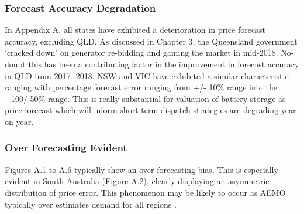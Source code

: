 \subsubsection{Forecast Accuracy Degradation}
In Appendix A, all states have exhibited a deterioration in price forecast accuracy, excluding QLD. As discussed in Chapter 3, the Queensland government `cracked down' on generator re-bidding and gaming the market in mid-2018. No-doubt this has been a contributing factor in the improvement in forecast accuracy in QLD from 2017- 2018. NSW and VIC have exhibited a similar characteristic ranging with percentage forecast error ranging from +/- 10\% range into the +100/-50\% range. This is really substantial for valuation of battery storage as price forecast which will inform short-term dispatch strategies are degrading year-on-year.
\subsubsection{Over Forecasting Evident}
Figures A.1 to A.6 typically show an over forecasting bias. This is especially evident in South Australia (Figure A.2), clearly displaying an asymmetric distribution of price error. This phenomenon may be likely to occur as AEMO typically over estimates demand for all regions \parencite{Madafiglio}.  
